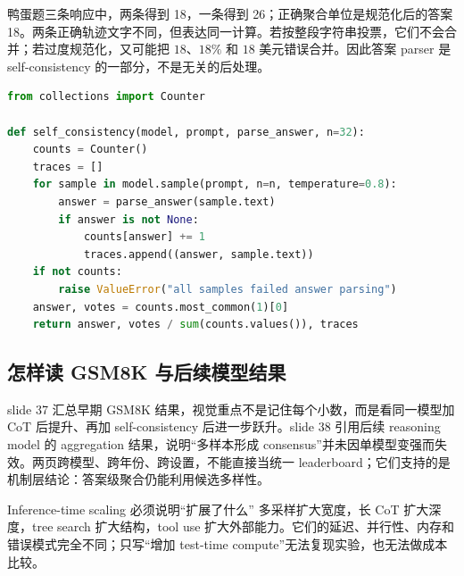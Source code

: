 

鸭蛋题三条响应中，两条得到 18，一条得到 26；正确聚合单位是规范化后的答案 18。两条正确轨迹文字不同，但表达同一计算。若按整段字符串投票，它们不会合并；若过度规范化，又可能把 $18$、$18\%$ 和 $18$ 美元错误合并。因此答案 parser 是 self-consistency 的一部分，不是无关的后处理。

\begin{lstlisting}[language=Python,caption={Exact-answer self-consistency 聚合}]
from collections import Counter

def self_consistency(model, prompt, parse_answer, n=32):
    counts = Counter()
    traces = []
    for sample in model.sample(prompt, n=n, temperature=0.8):
        answer = parse_answer(sample.text)
        if answer is not None:
            counts[answer] += 1
            traces.append((answer, sample.text))
    if not counts:
        raise ValueError("all samples failed answer parsing")
    answer, votes = counts.most_common(1)[0]
    return answer, votes / sum(counts.values()), traces
\end{lstlisting}

\subsection{怎样读 GSM8K 与后续模型结果}

slide 37 汇总早期 GSM8K 结果，视觉重点不是记住每个小数，而是看同一模型加 CoT 后提升、再加 self-consistency 后进一步跃升。slide 38 引用后续 reasoning model 的 aggregation 结果，说明“多样本形成 consensus”并未因单模型变强而失效。两页跨模型、跨年份、跨设置，不能直接当统一 leaderboard；它们支持的是机制层结论：答案级聚合仍能利用候选多样性。



\begin{warningbox}{Inference-time scaling 必须说明“扩展了什么”}
多采样扩大宽度，长 CoT 扩大深度，tree search 扩大结构，tool use 扩大外部能力。它们的延迟、并行性、内存和错误模式完全不同；只写“增加 test-time compute”无法复现实验，也无法做成本比较。
\end{warningbox}

